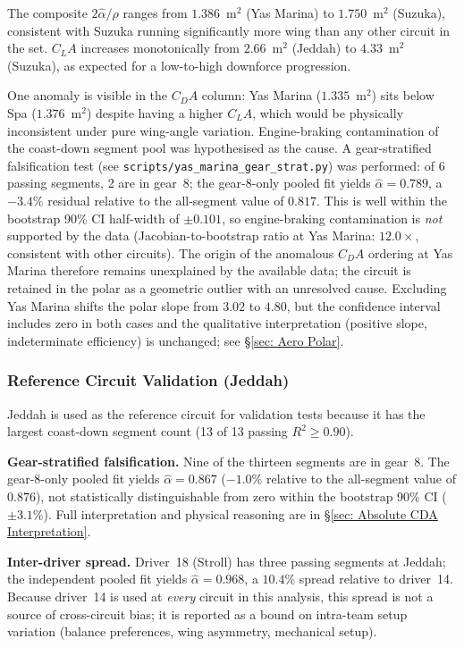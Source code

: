 The composite $2\hat\alpha/\rho$ ranges from $1.386$~m$^2$ (Yas Marina) to $1.750$~m$^2$ (Suzuka), consistent with Suzuka running significantly more wing than any other circuit in the set. $C_LA$ increases monotonically from $2.66$~m$^2$ (Jeddah) to $4.33$~m$^2$ (Suzuka), as expected for a low-to-high downforce progression.

One anomaly is visible in the $C_DA$ column: Yas Marina ($1.335$~m$^2$) sits below Spa ($1.376$~m$^2$) despite having a higher $C_LA$, which would be physically inconsistent under pure wing-angle variation. Engine-braking contamination of the coast-down segment pool was hypothesised as the cause. A gear-stratified falsification test (see \texttt{scripts/yas\_marina\_gear\_strat.py}) was performed: of 6 passing segments, 2 are in gear~8; the gear-8-only pooled fit yields $\hat\alpha = 0.789$, a $-3.4\%$ residual relative to the all-segment value of $0.817$. This is well within the bootstrap 90\% CI half-width of $\pm 0.101$, so engine-braking contamination is \emph{not} supported by the data (Jacobian-to-bootstrap ratio at Yas Marina: $12.0\times$, consistent with other circuits). The origin of the anomalous $C_DA$ ordering at Yas Marina therefore remains unexplained by the available data; the circuit is retained in the polar as a geometric outlier with an unresolved cause. Excluding Yas Marina shifts the polar slope from $3.02$ to $4.80$, but the confidence interval includes zero in both cases and the qualitative interpretation (positive slope, indeterminate efficiency) is unchanged; see \S\ref{sec: Aero Polar}.

\subsubsection{Reference Circuit Validation (Jeddah)}
\label{sec: Jeddah Validation}

Jeddah is used as the reference circuit for validation tests because it has the largest coast-down segment count (13 of 13 passing $R^2 \geq 0.90$).

\textbf{Gear-stratified falsification.} Nine of the thirteen segments are in gear~8. The gear-8-only pooled fit yields $\hat\alpha = 0.867$ ($-1.0\%$ relative to the all-segment value of $0.876$), not statistically distinguishable from zero within the bootstrap 90\% CI ($\pm 3.1\%$). Full interpretation and physical reasoning are in \S\ref{sec: Absolute CDA Interpretation}.

\textbf{Inter-driver spread.} Driver~18 (Stroll) has three passing segments at Jeddah; the independent pooled fit yields $\hat\alpha = 0.968$, a $10.4\%$ spread relative to driver~14. Because driver~14 is used at \emph{every} circuit in this analysis, this spread is not a source of cross-circuit bias; it is reported as a bound on intra-team setup variation (balance preferences, wing asymmetry, mechanical setup).

